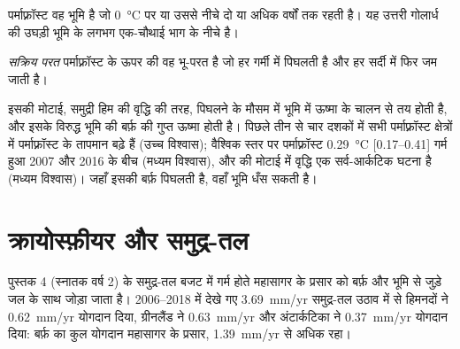 पर्माफ़्रॉस्ट वह भूमि है जो \qty{0}{\celsius} पर या उससे नीचे
दो या अधिक वर्षों तक रहती है। यह उत्तरी गोलार्ध की उघड़ी भूमि के
लगभग एक-चौथाई भाग के नीचे है।

\begin{definition}[सक्रिय परत]\label{def:b3:glaciology:permafrost}
\emph{सक्रिय परत} पर्माफ़्रॉस्ट के ऊपर की वह भू-परत है
जो हर गर्मी में पिघलती है और हर सर्दी में फिर जम जाती है।
\end{definition}

इसकी मोटाई, समुद्री हिम की वृद्धि की तरह, पिघलने के मौसम में भूमि में
ऊष्मा के चालन से तय होती है, और इसके विरुद्ध भूमि की बर्फ़ की गुप्त ऊष्मा होती है।
पिछले तीन से चार दशकों में सभी पर्माफ़्रॉस्ट क्षेत्रों में पर्माफ़्रॉस्ट के तापमान बढ़े हैं
(उच्च विश्वास); वैश्विक स्तर पर पर्माफ़्रॉस्ट
\qty{0.29}{\celsius} [\numrange{0.17}{0.41}] गर्म हुआ
2007 और 2016 के बीच (मध्यम विश्वास), और  की मोटाई में वृद्धि
एक सर्व-आर्कटिक घटना है (मध्यम विश्वास)।
जहाँ इसकी बर्फ़ पिघलती है, वहाँ भूमि धँस सकती है।

\section{क्रायोस्फ़ीयर और समुद्र-तल}\label{sec:b3:glaciology:sea-level}

पुस्तक 4 (स्नातक वर्ष 2) के समुद्र-तल बजट में गर्म होते महासागर के प्रसार को
बर्फ़ और भूमि से जुड़े जल के साथ जोड़ा जाता है। 2006--2018 में देखे गए
\qty{3.69}{mm/yr} समुद्र-तल उठाव में से हिमनदों ने \qty{0.62}{mm/yr} योगदान दिया,
ग्रीनलैंड ने \qty{0.63}{mm/yr} और अंटार्कटिका ने
\qty{0.37}{mm/yr} योगदान दिया: बर्फ़ का कुल योगदान महासागर के प्रसार,
\qty{1.39}{mm/yr} से अधिक रहा।

